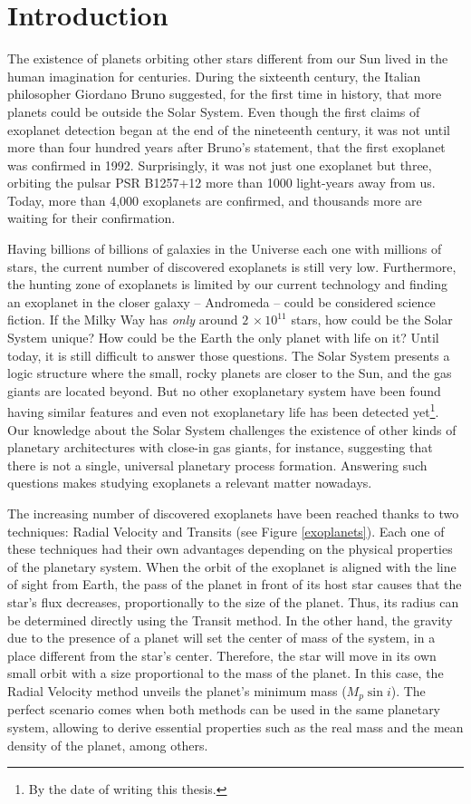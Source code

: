 \chapter{Introduction}\label{chap:intro}
The existence of planets orbiting other stars different from our Sun lived in the human imagination for centuries. During the sixteenth century, the Italian philosopher Giordano Bruno suggested, for the first time in history, that more planets could be outside the Solar System. Even though the first claims of exoplanet detection began at the end of the nineteenth century, it was not until more than four hundred years after Bruno's statement, that the first exoplanet was confirmed in 1992. Surprisingly, it was not just one exoplanet but three, orbiting the pulsar PSR B1257+12 more than 1000 light-years away from us. Today, more than 4,000 exoplanets are confirmed, and thousands more are waiting for their confirmation.

Having billions of billions of galaxies in the Universe each one with millions of stars, the current number of discovered exoplanets is still very low. Furthermore, the hunting zone of exoplanets is limited by our current technology and finding an exoplanet in the closer galaxy -- Andromeda -- could be considered science fiction. If the Milky Way has \textit{only} around $2\,\times10^{11}$ stars, how could be the Solar System unique? How could be the Earth the only planet with life on it? Until today, it is still difficult to answer those questions. The Solar System presents a logic structure where the small, rocky planets are closer to the Sun, and the gas giants are located beyond. But no other exoplanetary system have been found having similar features and even not exoplanetary life has been detected yet\footnote{By the date of writing this thesis.}. Our knowledge about the Solar System challenges the existence of other kinds of planetary architectures with close-in gas giants, for instance, suggesting that there is not a single, universal planetary process formation. Answering such questions makes studying exoplanets a relevant matter nowadays.

The increasing number of discovered exoplanets have been reached thanks to two techniques: Radial Velocity and Transits (see Figure \ref{exoplanets}). Each one of these techniques had their own advantages depending on the physical properties of the planetary system. When the orbit of the exoplanet is aligned with the line of sight from Earth, the pass of the planet in front of its host star causes that the star's flux decreases, proportionally to the size of the planet. Thus, its radius can be determined directly using the Transit method. In the other hand, the gravity due to the presence of a planet will set the center of mass of the system, in a place different from the star's center. Therefore, the star will move in its own small orbit with a size proportional to the mass of the planet. In this case, the Radial Velocity method unveils the planet's minimum mass ($M_{p}\sin i$). The perfect scenario comes when both methods can be used in the same planetary system, allowing to derive essential properties such as the real mass and the mean density of the planet, among others.

